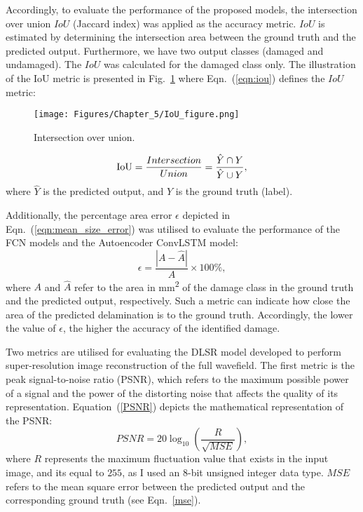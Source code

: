 Accordingly, to evaluate the performance of the proposed models, the intersection over union \(IoU\) (Jaccard index) was applied as the accuracy metric.
\(IoU\) is estimated by determining the intersection area between the ground truth and the predicted output.
Furthermore, we have two output classes (damaged and undamaged). 
The \(IoU\) was calculated for the damaged class only.
The illustration of the IoU metric is presented in Fig.~\ref{fig:iou} where Eqn.~(\ref{eqn:iou}) defines the \(IoU\) metric:
\begin{figure} [h!]
	\begin{center}
		\texttt{[image: Figures/Chapter\_5/IoU\_figure.png]}
	\end{center}
	\caption{Intersection over union.} 
	\label{fig:iou}
\end{figure}
\begin{equation}
	\textup{IoU}=\frac{Intersection}{Union}=\frac{\hat{Y} \cap Y}{\hat{Y} \cup Y},
	\label{eqn:iou}
\end{equation}
where \(\hat{Y}\) is the predicted output, and \(Y\) is the ground truth (label).

Additionally, the percentage area error $\epsilon$ depicted in Eqn.~(\ref{eqn:mean_size_error}) was utilised to evaluate the performance of the FCN models and the Autoencoder ConvLSTM model:
\begin{equation}
	\epsilon=\frac{|A-\hat{A}|}{A} \times 100\%,
	\label{eqn:mean_size_error}
\end{equation}
where \(A\) and \(\hat{A}\) refer to the area in mm\textsuperscript{2} of the damage class in the ground truth and the predicted output, respectively.
Such a metric can indicate how close the area of the predicted delamination is to the ground truth.
Accordingly, the lower the value of $\epsilon$, the higher the accuracy of the identified damage. 

Two metrics are utilised for evaluating the DLSR model developed to perform super-resolution image reconstruction of the full wavefield.
The first metric is the peak signal-to-noise ratio (PSNR), which refers to the maximum possible power of a signal and the power of the distorting noise that affects the quality of its representation.
Equation~(\ref{PSNR}) depicts the mathematical representation of the PSNR:
\begin{equation}
	PSNR=20\log_{10}\left(\frac{R}{\sqrt{MSE}}\right),
	\label{PSNR}
\end{equation}
where \(R\) represents the maximum fluctuation value that exists in the input image, and its equal to \(255\), as I used an 8-bit unsigned integer data type.
\(MSE\) refers to the mean square error between the predicted output and the corresponding ground truth (see Eqn.~\ref{mse}).

